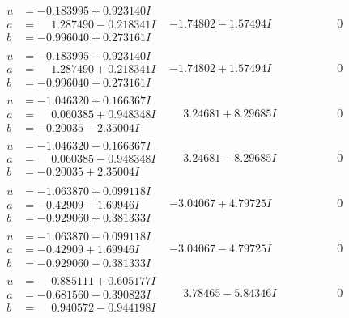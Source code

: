\documentclass[1p]{elsarticle_modified}
\theoremstyle{definition}
\begin{document}
$$\begin{array}{c|c|c}
\begin{aligned}
u &= -0.183995 + 0.923140 I \\
a &= \phantom{-}1.287490 - 0.218341 I \\
b &= -0.996040 + 0.273161 I\end{aligned}
 & -1.74802 - 1.57494 I & \phantom{-0.000000 } 0 \\ \hline\begin{aligned}
u &= -0.183995 - 0.923140 I \\
a &= \phantom{-}1.287490 + 0.218341 I \\
b &= -0.996040 - 0.273161 I\end{aligned}
 & -1.74802 + 1.57494 I & \phantom{-0.000000 } 0 \\ \hline\begin{aligned}
u &= -1.046320 + 0.166367 I \\
a &= \phantom{-}0.060385 + 0.948348 I \\
b &= -0.20035 - 2.35004 I\end{aligned}
 & \phantom{-}3.24681 + 8.29685 I & \phantom{-0.000000 } 0 \\ \hline\begin{aligned}
u &= -1.046320 - 0.166367 I \\
a &= \phantom{-}0.060385 - 0.948348 I \\
b &= -0.20035 + 2.35004 I\end{aligned}
 & \phantom{-}3.24681 - 8.29685 I & \phantom{-0.000000 } 0 \\ \hline\begin{aligned}
u &= -1.063870 + 0.099118 I \\
a &= -0.42909 - 1.69946 I \\
b &= -0.929060 + 0.381333 I\end{aligned}
 & -3.04067 + 4.79725 I & \phantom{-0.000000 } 0 \\ \hline\begin{aligned}
u &= -1.063870 - 0.099118 I \\
a &= -0.42909 + 1.69946 I \\
b &= -0.929060 - 0.381333 I\end{aligned}
 & -3.04067 - 4.79725 I & \phantom{-0.000000 } 0 \\ \hline\begin{aligned}
u &= \phantom{-}0.885111 + 0.605177 I \\
a &= -0.681560 - 0.390823 I \\
b &= \phantom{-}0.940572 - 0.944198 I\end{aligned}
 & \phantom{-}3.78465 - 5.84346 I & \phantom{-0.000000 } 0 \\ \hline\begin{aligned}

\end{aligned}
\end{array}$$
\end{document}
